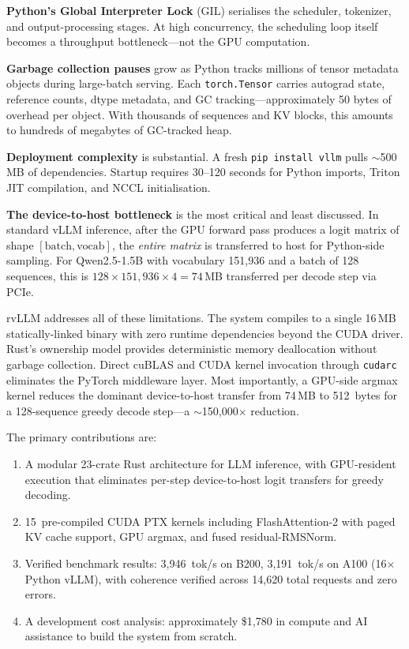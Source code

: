 \documentclass[11pt,a4paper]{article}
\begin{document}
\textbf{Python's Global Interpreter Lock} (GIL) serialises the scheduler, tokenizer,
and output-processing stages. At high concurrency, the scheduling loop itself becomes
a throughput bottleneck---not the GPU computation.

\textbf{Garbage collection pauses} grow as Python tracks millions of tensor metadata
objects during large-batch serving. Each \texttt{torch.Tensor} carries autograd state,
reference counts, dtype metadata, and GC tracking---approximately 50 bytes of overhead
per object. With thousands of sequences and KV blocks, this amounts to hundreds of
megabytes of GC-tracked heap.

\textbf{Deployment complexity} is substantial. A fresh \texttt{pip install vllm}
pulls $\sim$500\,MB of dependencies. Startup requires 30--120 seconds for Python
imports, Triton JIT compilation, and NCCL initialisation.

\textbf{The device-to-host bottleneck} is the most critical and least discussed.
In standard vLLM inference, after the GPU forward pass produces a logit matrix of
shape $[\text{batch}, \text{vocab}]$, the \emph{entire matrix} is transferred to
host for Python-side sampling. For Qwen2.5-1.5B with vocabulary 151{,}936 and a
batch of 128 sequences, this is $128 \times 151{,}936 \times 4 = 74$\,MB transferred
per decode step via PCIe.

rvLLM addresses all of these limitations. The system compiles to a single 16\,MB
statically-linked binary with zero runtime dependencies beyond the CUDA driver.
Rust's ownership model provides deterministic memory deallocation without garbage
collection. Direct cuBLAS and CUDA kernel invocation through
\texttt{cudarc}~\cite{cudarc2023} eliminates the PyTorch middleware layer. Most
importantly, a GPU-side argmax kernel reduces the dominant device-to-host transfer
from 74\,MB to 512~bytes for a 128-sequence greedy decode step---a
$\sim$150{,}000$\times$ reduction.

The primary contributions are:
\begin{enumerate}
  \item A modular 23-crate Rust architecture for LLM inference, with GPU-resident
        execution that eliminates per-step device-to-host logit transfers for greedy
        decoding.
  \item 15~pre-compiled CUDA PTX kernels including FlashAttention-2 with paged KV
        cache support, GPU argmax, and fused residual-RMSNorm.
  \item Verified benchmark results: 3{,}946~tok/s on B200, 3{,}191~tok/s on A100
        (16$\times$ Python vLLM), with coherence verified across 14{,}620 total
        requests and zero errors.
  \item A development cost analysis: approximately \$1{,}780 in compute and AI
        assistance to build the system from scratch.
\end{enumerate}
\end{document}
